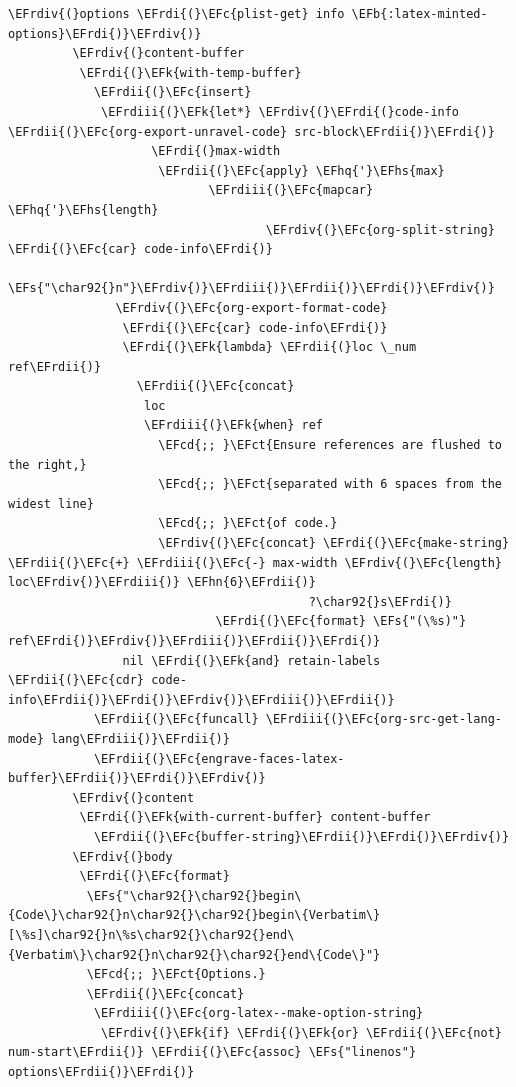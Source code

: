 \documentclass{scrartcl}
\newcommand{\EFk}[1]{\textcolor{EFk}{#1}} %
\newcommand{\EFs}[1]{\textcolor{EFs}{#1}} %
\newcommand{\EFb}[1]{\textcolor{EFb}{#1}} %
\newcommand{\EFct}[1]{\textcolor{EFct}{#1}} %
\newcommand{\EFc}[1]{\textcolor{EFc}{#1}} %
\newcommand{\EFcd}[1]{\textcolor{EFcd}{#1}} %
\newcommand{\EFhn}[1]{#1} %
\newcommand{\EFhq}[1]{#1} %
\newcommand{\EFhs}[1]{#1} %
\newcommand{\EFrdi}[1]{#1} %
\newcommand{\EFrdii}[1]{#1} %
\newcommand{\EFrdiii}[1]{#1} %
\newcommand{\EFrdiv}[1]{#1} %
\begin{document}
\begin{Code}
\begin{Verbatim}[]
         \EFrdiv{(}options \EFrdi{(}\EFc{plist-get} info \EFb{:latex-minted-options}\EFrdi{)}\EFrdiv{)}
         \EFrdiv{(}content-buffer
          \EFrdi{(}\EFk{with-temp-buffer}
            \EFrdii{(}\EFc{insert}
             \EFrdiii{(}\EFk{let*} \EFrdiv{(}\EFrdi{(}code-info \EFrdii{(}\EFc{org-export-unravel-code} src-block\EFrdii{)}\EFrdi{)}
                    \EFrdi{(}max-width
                     \EFrdii{(}\EFc{apply} \EFhq{'}\EFhs{max}
                            \EFrdiii{(}\EFc{mapcar} \EFhq{'}\EFhs{length}
                                    \EFrdiv{(}\EFc{org-split-string} \EFrdi{(}\EFc{car} code-info\EFrdi{)}
                                                      \EFs{"\char92{}n"}\EFrdiv{)}\EFrdiii{)}\EFrdii{)}\EFrdi{)}\EFrdiv{)}
               \EFrdiv{(}\EFc{org-export-format-code}
                \EFrdi{(}\EFc{car} code-info\EFrdi{)}
                \EFrdi{(}\EFk{lambda} \EFrdii{(}loc \_num ref\EFrdii{)}
                  \EFrdii{(}\EFc{concat}
                   loc
                   \EFrdiii{(}\EFk{when} ref
                     \EFcd{;; }\EFct{Ensure references are flushed to the right,}
                     \EFcd{;; }\EFct{separated with 6 spaces from the widest line}
                     \EFcd{;; }\EFct{of code.}
                     \EFrdiv{(}\EFc{concat} \EFrdi{(}\EFc{make-string} \EFrdii{(}\EFc{+} \EFrdiii{(}\EFc{-} max-width \EFrdiv{(}\EFc{length} loc\EFrdiv{)}\EFrdiii{)} \EFhn{6}\EFrdii{)}
                                          ?\char92{}s\EFrdi{)}
                             \EFrdi{(}\EFc{format} \EFs{"(\%s)"} ref\EFrdi{)}\EFrdiv{)}\EFrdiii{)}\EFrdii{)}\EFrdi{)}
                nil \EFrdi{(}\EFk{and} retain-labels \EFrdii{(}\EFc{cdr} code-info\EFrdii{)}\EFrdi{)}\EFrdiv{)}\EFrdiii{)}\EFrdii{)}
            \EFrdii{(}\EFc{funcall} \EFrdiii{(}\EFc{org-src-get-lang-mode} lang\EFrdiii{)}\EFrdii{)}
            \EFrdii{(}\EFc{engrave-faces-latex-buffer}\EFrdii{)}\EFrdi{)}\EFrdiv{)}
         \EFrdiv{(}content
          \EFrdi{(}\EFk{with-current-buffer} content-buffer
            \EFrdii{(}\EFc{buffer-string}\EFrdii{)}\EFrdi{)}\EFrdiv{)}
         \EFrdiv{(}body
          \EFrdi{(}\EFc{format}
           \EFs{"\char92{}\char92{}begin\{Code\}\char92{}n\char92{}\char92{}begin\{Verbatim\}[\%s]\char92{}n\%s\char92{}\char92{}end\{Verbatim\}\char92{}n\char92{}\char92{}end\{Code\}"}
           \EFcd{;; }\EFct{Options.}
           \EFrdii{(}\EFc{concat}
            \EFrdiii{(}\EFc{org-latex--make-option-string}
             \EFrdiv{(}\EFk{if} \EFrdi{(}\EFk{or} \EFrdii{(}\EFc{not} num-start\EFrdii{)} \EFrdii{(}\EFc{assoc} \EFs{"linenos"} options\EFrdii{)}\EFrdi{)}

\end{Verbatim}
\end{Code}
\end{document}
